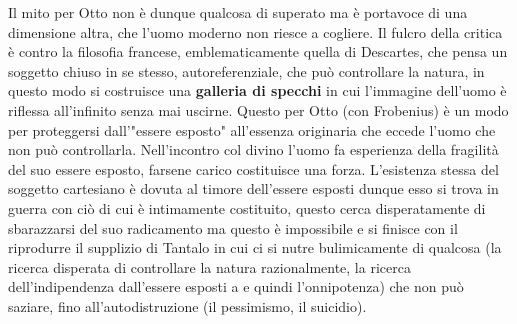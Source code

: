 \documentclass[10pt,a4paper]{article}
\begin{document}
Il mito per Otto non è dunque qualcosa di superato ma è portavoce di una dimensione altra, che l'uomo moderno non riesce a cogliere. Il fulcro della critica è contro la filosofia francese, emblematicamente quella di Descartes, che pensa un soggetto chiuso in se stesso, autoreferenziale, che può controllare la natura, in questo modo si costruisce una \textbf{galleria di specchi} in cui l'immagine dell'uomo è riflessa all'infinito senza mai uscirne. Questo per Otto (con Frobenius) è un modo per proteggersi dall'"essere esposto" all'essenza originaria che eccede l'uomo che non può controllarla. Nell'incontro col divino l'uomo fa esperienza della fragilità del suo essere esposto, farsene carico costituisce una forza. L'esistenza stessa del soggetto cartesiano è dovuta al timore dell'essere esposti dunque esso si trova in guerra con ciò di cui è intimamente costituito, questo cerca disperatamente di sbarazzarsi del suo radicamento ma questo è impossibile e si finisce con il riprodurre il supplizio di Tantalo in cui ci si nutre bulimicamente di qualcosa (la ricerca disperata di controllare la natura razionalmente, la ricerca dell'indipendenza dall'essere esposti a e quindi l'onnipotenza) che non può saziare, fino all'autodistruzione (il pessimismo, il suicidio).
\end{document}
